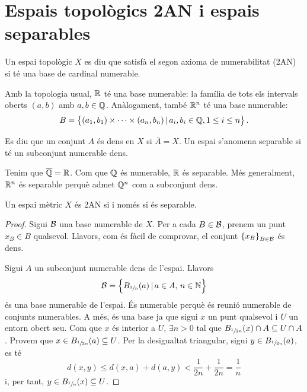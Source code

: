 \section{Espais topològics 2AN i espais separables}

\begin{defi}
    Un espai topològic $X$ es diu que satisfà el segon axioma de numerabilitat (2AN) si té una base de cardinal numerable.
\end{defi}

\begin{example}
    Amb la topologia usual, $\mathbb{R}$ t\'e una base numerable: la fam\'ilia de tots els intervals oberts $(a, b)$ amb $a, b \in \mathbb{Q}$. An\`alogament, també $\mathbb{R}^n$ té una base numerable:
    \[B=\left\{(a_1,b_1)\times\dots\times(a_n,b_n)\,|\,a_i, b_i\in \mathbb{Q}, 1\leq i\leq n\right\}. \]
\end{example}

\begin{defi}
    Es diu que un conjunt $A$ és dens en $X$ si $\overline{A} = X$. Un espai s'anomena separable si té un subconjunt numerable dens.
\end{defi}

\begin{example}
    Tenim que $\overline{\mathbb{Q}} = \mathbb{R}$. Com que $\mathbb{Q}$ és numerable, $\mathbb{R}$ és separable. Més generalment, $\mathbb{R}^n$ és separable perquè admet $\mathbb{Q}^n$ com a subconjunt dens.
\end{example}

\begin{prop}
    Un espai mètric $X$ és 2AN si i només si és separable.
\end{prop}
\begin{proof}
    Sigui $\mathcal{B}$ una base numerable de $X$. Per a cada $B \in \mathcal{B}$, prenem un punt $x_B \in B$ qualsevol. Llavors, com és fàcil de comprovar, el conjunt $\left\{x_B\right\}_{B \in \mathcal{B}}$ és dens.
    
    \quad
    
    Sigui $A$ un subconjunt numerable dens de l'espai. Llavors
    \[\mathcal{B} = \left\{B_{\sfrac{1}{n}} (a) \, | \, a\in A, \, n\in \mathbb{N}\right\}\]
    és una base numerable de l'espai. És numerable perquè és reunió numerable de conjunts numerables. A més, és una base ja que sigui $x$ un punt qualsevol i $U$ un entorn obert seu. Com que $x$ és interior a $U$, $\exists n>0$ tal que $B_{\sfrac{1}{2n}}(x)\cap A\subseteq U\cap A$. Provem que $x \in B_{\sfrac{1}{2n}}(a)\subseteq U$. Per la desigualtat triangular, sigui $y \in B_{\sfrac{1}{2n}}(a)$, es té
    \[d(x, y) \leq d(x, a) + d(a, y) < \frac{1}{2n} + \frac{1}{2n} = \frac{1}{n}\]
    i, per tant, $y\in B_{\sfrac{1}{n}}(x) \subseteq U$.
\end{proof}

